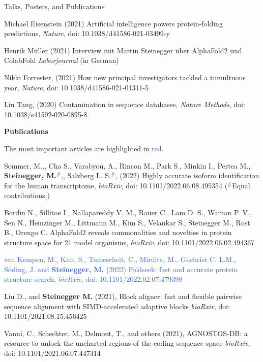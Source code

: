 \documentclass{resume} %
\begin{document}
\begin{rSection}{Talks, Posters, and Publications}
\begin{thebibliography}{10}
Michael Eisenstein (2021)
Artificial intelligence powers protein-folding predictions, {\em Nature}, doi: 10.1038/d41586-021-03499-y

Henrik Müller (2021)
Interview mit Martin Steinegger über AlphaFold2 und ColabFold {\em Laborjournal} (in German)

Nikki Forrester, (2021)
How new principal investigators tackled a tumultuous year, {\em Nature}, doi: 10.1038/d41586-021-01311-5

Lin Tang, (2020)
Contamination in sequence databases, {\em Nature Methods}, doi: 10.1038/s41592-020-0895-8
\end{thebibliography}




{\bf Publications }\vspace{1mm}

The most important articles are highlighted in \textcolor{highlight}{red}.
\begin{thebibliography}{10}
\vspace{-13mm}

Sommer, M.,, Cha S., Varabyou, A., Rincon M.,  Park S., Minkin I., Pertea M.,  {\bf Steinegger, M.}$^\#$,, Salzberg L. S.$^\#$, (2022)
Highly accurate isoform identification for the human transcriptome, {\em bioRxiv}, doi: 10.1101/2022.06.08.495354  ($^\#$Equal contributions.)

Bordin N., Sillitoe I., Nallapareddy V. M., Rauer C., Lam D. S., Waman P. V., Sen N., Heinzinger M., Littmann M., Kim S., Velankar S., Steinegger M., Rost B., Orengo C.
AlphaFold2 reveals commonalities and novelties in protein structure space for 21 model organisms, {\em bioRxiv}, doi: 10.1101/2022.06.02.494367 

\textcolor{highlight}{
van Kempen, M., Kim, S., Tumescheit, C., Mirdita, M., Gilchrist C. L.M., S{\"o}ding, J. and {\bf Steinegger, M.}  (2022)
Foldseek: fast and accurate protein structure search, {\em bioRxiv}, doi: 10.1101/2022.02.07.479398 
}

Liu D., and {\bf Steinegger M.} (2021),
Block aligner: fast and flexible pairwise sequence alignment with SIMD-accelerated adaptive blocks {\em bioRxiv}, doi: 10.1101/2021.08.15.456425

Vanni, C., Schechter, M., Delmont, T., and others (2021),
AGNOSTOS-DB: a resource to unlock the uncharted regions of the coding sequence space {\em bioRxiv}, doi: 10.1101/2021.06.07.447314


\end{thebibliography}
\end{rSection}
\end{document}
